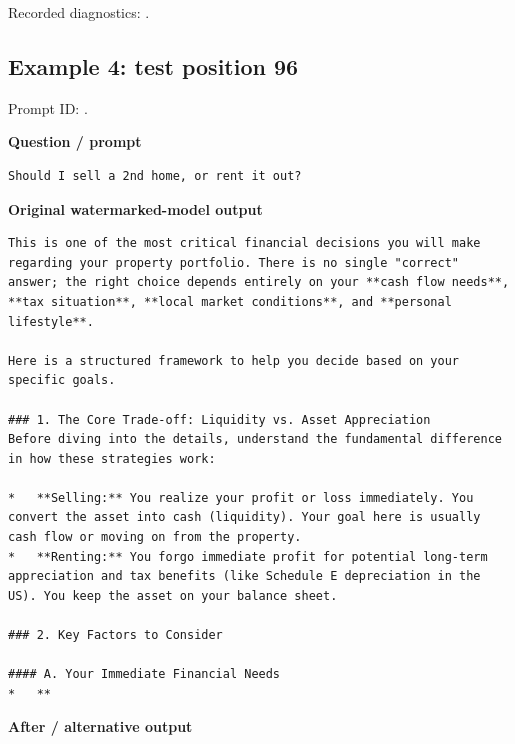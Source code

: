 Recorded diagnostics:
\texttt{}.

\subsection{Example 4: test position
96}\label{record-docs-watermarking-qualitative-text-latent-smoothing-md-example-4-test-position-96}

Prompt ID:
\texttt{}.

\textbf{Question / prompt}

\begin{Verbatim}
Should I sell a 2nd home, or rent it out?
\end{Verbatim}

\textbf{Original watermarked-model output}

\begin{Verbatim}
This is one of the most critical financial decisions you will make regarding your property portfolio. There is no single "correct" answer; the right choice depends entirely on your **cash flow needs**, **tax situation**, **local market conditions**, and **personal lifestyle**.

Here is a structured framework to help you decide based on your specific goals.

### 1. The Core Trade-off: Liquidity vs. Asset Appreciation
Before diving into the details, understand the fundamental difference in how these strategies work:

*   **Selling:** You realize your profit or loss immediately. You convert the asset into cash (liquidity). Your goal here is usually cash flow or moving on from the property.
*   **Renting:** You forgo immediate profit for potential long-term appreciation and tax benefits (like Schedule E depreciation in the US). You keep the asset on your balance sheet.

### 2. Key Factors to Consider

#### A. Your Immediate Financial Needs
*   **
\end{Verbatim}

\textbf{After / alternative output}


